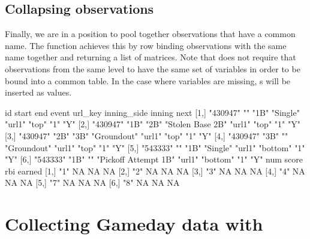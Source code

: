 \begin{article}
\subsection{Collapsing observations}

Finally, we are in a position to pool together observations that have
a common name. The  function achieves this by
row binding observations with the same name together and returning
a list of matrices. Note that  does not require
that observations from the same level to have the same set of variables
in order to be bound into a common table. In the case where variables
are missing, s will be inserted as values.
%
\begin{Schunk}
\begin{Soutput}
     id       start end  event                url_key inning_side inning next
[1,] "430947" ""    "1B" "Single"             "url1"  "top"       "1"    "Y" 
[2,] "430947" "1B"  "2B" "Stolen Base 2B"     "url1"  "top"       "1"    "Y" 
[3,] "430947" "2B"  "3B" "Groundout"          "url1"  "top"       "1"    "Y" 
[4,] "430947" "3B"  ""   "Groundout"          "url1"  "top"       "1"    "Y" 
[5,] "543333" ""    "1B" "Single"             "url1"  "bottom"    "1"    "Y" 
[6,] "543333" "1B"  ""   "Pickoff Attempt 1B" "url1"  "bottom"    "1"    "Y" 
     num score rbi earned
[1,] "1" NA    NA  NA    
[2,] "2" NA    NA  NA    
[3,] "3" NA    NA  NA    
[4,] "4" NA    NA  NA    
[5,] "7" NA    NA  NA    
[6,] "8" NA    NA  NA    
\end{Soutput}
\end{Schunk}
%


\section[Collecting Gameday data with pitchRx]{Collecting Gameday data with }


\end{article}
